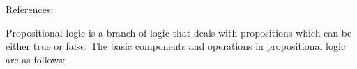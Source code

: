 
References:\cite{youtube:COSE419-Lecture4-1}

Propositional logic is a branch of logic that deals with propositions which can be either true or false. The basic components and operations in propositional logic are as follows:

%
%

